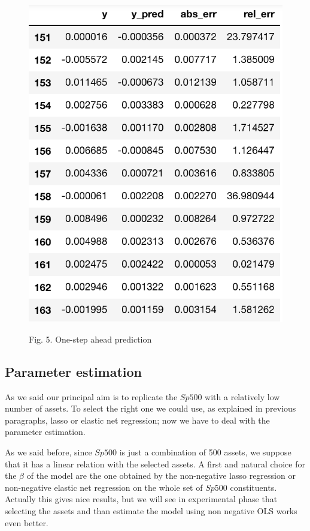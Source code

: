 \documentclass{article}%
\begin{document}
\begin{figure}[h!!!]
  \centering
  \includegraphics[scale=0.55]{pred_step1.png}     
\begin{center}
\begin{small}
Fig. 5. One-step ahead prediction
\end{small}
\end{center}

  \label{err_step}
\end{figure}




\subsection{Parameter estimation}
As we said our principal aim is to replicate the $Sp500$ with a relatively low number of assets. To select the right one we could use, as explained in previous paragraphs, lasso or elastic net regression; now we have to deal with the parameter estimation.

As we said before, since  $Sp500$ is just a combination of 500 assets, we suppose that it has a linear relation with the selected assets. A first and natural choice for the $\beta$ of the model are the one obtained by the non-negative lasso regression or non-negative elastic net regression on the whole set of $Sp500$ constituents. Actually this gives nice results, but we will see in experimental phase that selecting the assets and than estimate the model using non negative OLS works even better. 
\\
\end{document}
